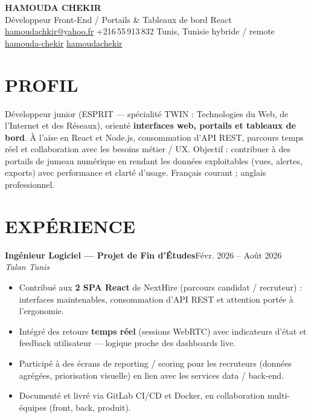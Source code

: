 \documentclass[10pt,a4paper]{article}
\newcommand{\TargetTitle}{Développeur Front-End / Portails \& Tableaux de bord \textbar{} React}
\newcommand{\job}[3]{%
  \textbf{\color{primary}#1}\hfill{\color{muted}\small #2}\\[-1pt]
  {\color{accent}\textit{#3}}\\[2pt]
  \begin{itemize}[leftmargin=0.85em, itemsep=1pt, topsep=0pt, parsep=0pt, partopsep=0pt]
}
\newcommand{\contactsep}{\hspace{5pt}{\color{rulecolor}|}\hspace{5pt}}
\begin{document}
{\fontsize{22}{26}\selectfont\bfseries\color{primary}HAMOUDA CHEKIR}\\[2pt]
{\large\color{accent}\TargetTitle}\\[4pt]
{\footnotesize\color{muted}%
  \hspace{3pt}\href{mailto:hamoudachkir@yahoo.fr}{hamoudachkir@yahoo.fr}%
  \contactsep
  \hspace{3pt}+216\,55\,913\,832%
  \contactsep
  \hspace{3pt}Tunis, Tunisie \textbar{} hybride / remote%
}\\[2pt]
{\footnotesize\color{muted}%
  \hspace{3pt}\href{https://www.linkedin.com/in/hamouda-chekir-5053572b4}{hamouda-chekir}%
  \contactsep
  \hspace{3pt}\href{https://github.com/hamoudachekir}{hamoudachekir}%
}\\[6pt]

\section{PROFIL}
Développeur junior (ESPRIT --- spécialité TWIN : Technologies du Web, de l'Internet et des Réseaux), orienté \textbf{interfaces web, portails et tableaux de bord}.
À l'aise en React et Node.js, consommation d'API REST, parcours temps réel et collaboration avec les besoins métier / UX.
Objectif : contribuer à des portails de jumeau numérique en rendant les données exploitables (vues, alertes, exports) avec performance et clarté d'usage.
Français courant ; anglais professionnel.

\section{EXPÉRIENCE}

\job{Ingénieur Logiciel — Projet de Fin d'Études}{Févr. 2026 -- Août 2026}{Talan \textbar{} Tunis}
  \item Contribué aux \textbf{2 SPA React} de NextHire (parcours candidat / recruteur) : interfaces maintenables, consommation d'API REST et attention portée à l'ergonomie.
  \item Intégré des retours \textbf{temps réel} (sessions WebRTC) avec indicateurs d'état et feedback utilisateur --- logique proche des dashboards live.
  \item Participé à des écrans de reporting / scoring pour les recruteurs (données agrégées, priorisation visuelle) en lien avec les services data / back-end.
  \item Documenté et livré via GitLab CI/CD et Docker, en collaboration multi-équipes (front, back, produit).
\end{itemize}
\end{document}
